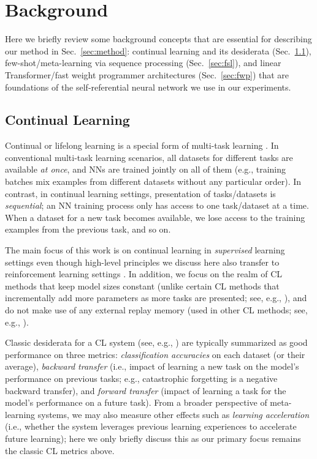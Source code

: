 \documentclass{article}
\begin{document}
\section{Background}
\label{sec:background}
Here we briefly review some background concepts that are essential for describing our method in Sec.~\ref{sec:method}: continual learning and its desiderata (Sec.~\ref{sec:cl}), few-shot/meta-learning via sequence processing (Sec.~\ref{sec:fsl}),
and linear Transformer/fast weight programmer architectures (Sec.~\ref{sec:fwp}) that are foundations of the self-referential neural network we use in our experiments.

\subsection{Continual Learning}
\label{sec:cl}
Continual or lifelong learning is a special form of multi-task learning \citep{thrun1998lifelong,caruana1997multitask}.
In conventional multi-task learning scenarios, all datasets for different tasks are available \textit{at once}, and NNs are trained jointly on all of them (e.g., training batches mix examples from different datasets without any particular order).
In contrast, in continual learning settings, presentation of tasks/datasets is \textit{sequential}; an NN training process only has access to one task/dataset at a time.
When a dataset for a new task becomes available, we lose access to the training examples from the previous task, and so on.

The main focus of this work is on continual learning in \textit{supervised} learning settings even though high-level principles we discuss here also transfer to reinforcement learning settings \citep{ring1994continual}.
In addition, we focus on the realm of CL methods that keep model sizes constant (unlike certain CL methods that incrementally add more parameters as more tasks are presented; see, e.g., \citet{rusu2016progressive}), and do not make use of any external replay memory (used in other CL methods; see, e.g., \citet{robins1995catastrophic,ShinLKK17,RolnickASLW19,RiemerCALRTT19,ZhangPFBLJ22}).

Classic desiderata for a CL system (see, e.g., \citet{LopezPazR17, VeniatDR21}) are typically summarized as good performance on three metrics:
\textit{classification accuracies} on each dataset (or their average), \textit{backward transfer} (i.e., impact of learning a new task on the model's performance on previous tasks; e.g., catastrophic forgetting is a negative backward transfer), and \textit{forward transfer} (impact of learning a task for the model's performance on a future task).
From a broader perspective of meta-learning systems,
we may also measure other effects such as \textit{learning acceleration} (i.e., whether the system leverages previous learning experiences to accelerate future learning); here we only briefly discuss this as our primary focus remains the classic CL metrics above.
\end{document}
